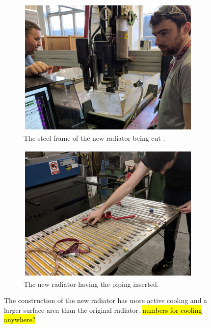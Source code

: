 \begin{figure}[htbp]
\centering
\begin{subfigure}{.5\textwidth}
  \centering
  \includegraphics[width=\linewidth]{Chapter3/Figs/Raster/detCon011b_RadiatorConstruction.png}
  \captionsetup{width=.9\linewidth}
  \caption{The steel frame of the new radiator being cut .}
  \label{subFig:detCon011b_RadiatorConstruction}
\end{subfigure}%
\begin{subfigure}{.5\textwidth}
  \centering
  \includegraphics[width=\linewidth]{Chapter3/Figs/Raster/detCon012b_RadiatorPiping.png}
  \captionsetup{width=.9\linewidth}
  \caption{The new radiator having the piping inserted.}
  \label{subFig:detCon012b_RadiatorPiping}
\end{subfigure}
\caption{The construction of the new radiator has more active cooling and a larger surface area than the original radiator. \hl{numbers for cooling anywhere?}}
\label{fig:detCon_RadiatorConstruction_RadiatorPiping}
\end{figure}

